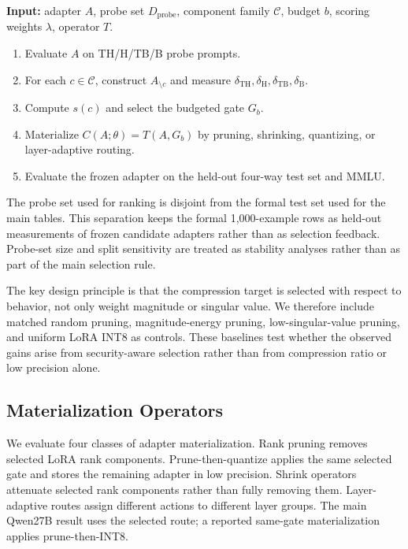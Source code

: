 \begin{tcolorbox}[title={Algorithm 1: SAC procedure},breakable,colback=white,colbacktitle=black!8,coltitle=black,fonttitle=\bfseries\footnotesize,colframe=black!45,boxrule=0.45pt,left=2pt,right=2pt,top=2pt,bottom=2pt,before skip=4pt,after skip=4pt]
\footnotesize
\textbf{Input:} adapter $A$, probe set $D_{\mathrm{probe}}$, component family $\mathcal{C}$, budget $b$, scoring weights $\lambda$, operator $T$.
\begin{enumerate}[leftmargin=*,itemsep=1pt,topsep=1pt]
    \item Evaluate $A$ on TH/H/TB/B probe prompts.
    \item For each $c\in\mathcal{C}$, construct $A_{\setminus c}$ and measure $\delta_{\mathrm{TH}},\delta_{\mathrm{H}},\delta_{\mathrm{TB}},\delta_{\mathrm{B}}$.
    \item Compute $s(c)$ and select the budgeted gate $G_b$.
    \item Materialize $C(A;\theta)=T(A,G_b)$ by pruning, shrinking, quantizing, or layer-adaptive routing.
    \item Evaluate the frozen adapter on the held-out four-way test set and MMLU.
\end{enumerate}
\end{tcolorbox}

The probe set used for ranking is disjoint from the formal test set used for the main tables.
This separation keeps the formal 1,000-example rows as held-out measurements of frozen candidate adapters rather than as selection feedback.
Probe-set size and split sensitivity are treated as stability analyses rather than as part of the main selection rule.

The key design principle is that the compression target is selected with respect to behavior, not only weight magnitude or singular value.
We therefore include matched random pruning, magnitude-energy pruning, low-singular-value pruning, and uniform LoRA INT8 as controls.
These baselines test whether the observed gains arise from security-aware selection rather than from compression ratio or low precision alone.

\subsection{Materialization Operators}

We evaluate four classes of adapter materialization.
Rank pruning removes selected LoRA rank components.
Prune-then-quantize applies the same selected gate and stores the remaining adapter in low precision.
Shrink operators attenuate selected rank components rather than fully removing them.
Layer-adaptive routes assign different actions to different layer groups.
The main Qwen27B result uses the selected  route; a reported same-gate materialization applies prune-then-INT8.

